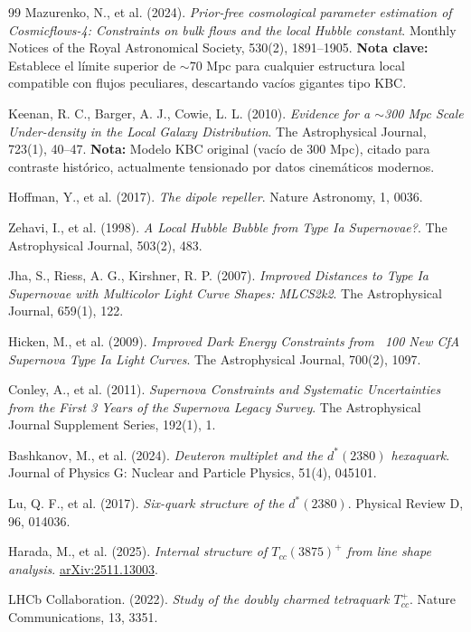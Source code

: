 \documentclass[11pt, a4paper]{article}
\theoremstyle{plain}
\theoremstyle{definition}
\begin{document}
\begin{thebibliography}{99}
Mazurenko, N., et al. (2024). \textit{Prior-free cosmological parameter estimation of Cosmicflows-4: Constraints on bulk flows and the local Hubble constant}. Monthly Notices of the Royal Astronomical Society, 530(2), 1891–1905. 
\textbf{Nota clave:} Establece el límite superior de $\sim 70$ Mpc para cualquier estructura local compatible con flujos peculiares, descartando vacíos gigantes tipo KBC.

Keenan, R. C., Barger, A. J., Cowie, L. L. (2010). \textit{Evidence for a $\sim$300 Mpc Scale Under-density in the Local Galaxy Distribution}. The Astrophysical Journal, 723(1), 40–47. 
\textbf{Nota:} Modelo KBC original (vacío de 300 Mpc), citado para contraste histórico, actualmente tensionado por datos cinemáticos modernos.

Hoffman, Y., et al. (2017). \textit{The dipole repeller}. Nature Astronomy, 1, 0036.

Zehavi, I., et al. (1998). \textit{A Local Hubble Bubble from Type Ia Supernovae?}. The Astrophysical Journal, 503(2), 483.

Jha, S., Riess, A. G., Kirshner, R. P. (2007). \textit{Improved Distances to Type Ia Supernovae with Multicolor Light Curve Shapes: MLCS2k2}. The Astrophysical Journal, 659(1), 122.

Hicken, M., et al. (2009). \textit{Improved Dark Energy Constraints from ~100 New CfA Supernova Type Ia Light Curves}. The Astrophysical Journal, 700(2), 1097.

Conley, A., et al. (2011). \textit{Supernova Constraints and Systematic Uncertainties from the First 3 Years of the Supernova Legacy Survey}. The Astrophysical Journal Supplement Series, 192(1), 1.

Bashkanov, M., et al. (2024). \textit{Deuteron multiplet and the $d^*(2380)$ hexaquark}. Journal of Physics G: Nuclear and Particle Physics, 51(4), 045101.

Lu, Q. F., et al. (2017). \textit{Six-quark structure of the $d^*(2380)$}. Physical Review D, 96, 014036.

Harada, M., et al. (2025). \textit{Internal structure of $T_{cc}(3875)^+$ from line shape analysis}. \url{arXiv:2511.13003}.

LHCb Collaboration. (2022). \textit{Study of the doubly charmed tetraquark $T_{cc}^+$}. Nature Communications, 13, 3351.


\end{thebibliography}
\end{document}
